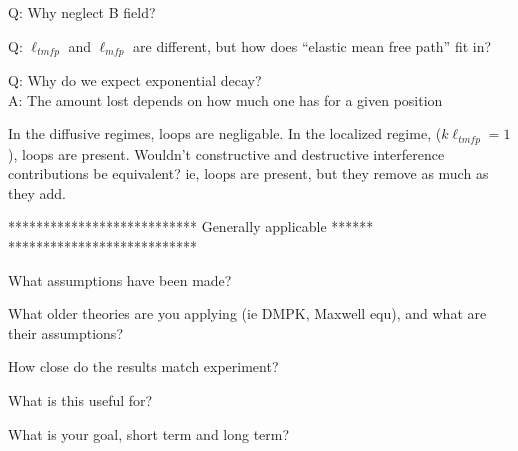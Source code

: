 \documentclass[12pt]{report} %
\begin{document}
Q: Why neglect B field?


Q: $\ell_{tmfp}$ and $\ell_{mfp}$ are different, but how does ``elastic mean free path'' fit in?


Q: Why do we expect exponential decay? \\
A: The amount lost depends on how much one has for a given position


In the diffusive regimes, loops are negligable. In the localized regime, ($k \ell_{tmfp}=1$), loops are present. Wouldn't constructive and destructive interference contributions be equivalent? ie, loops are present, but they remove as much as they add. 


***************************
Generally applicable ******
***************************

What assumptions have been made?

What older theories are you applying (ie DMPK, Maxwell equ), and what are their assumptions?

How close do the results match experiment?

What is this useful for?

What is your goal, short term and long term?
\end{document}

